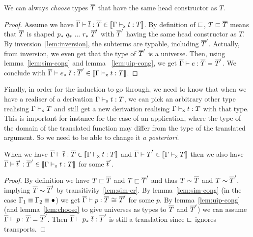\begin{lemma}
  \label{lem:choose}
  We can always \emph{choose} types $\overline{T}$ that have the same head constructor
  as $T$.
\end{lemma}

\begin{proof}
  Assume we have $\overline{\Gamma} \vdash \overline{t} : \overline{T} \in \llbracket \Gamma \vdash_{\mathsf{x}} t : T \rrbracket$.
  By definition of $\sqsubset$,
  $T \sqsubset \overline{T}$ means that $\overline{T}$ is shaped
  $\translpo{p}\ \translpo{q}\ ...\ \translpo{r}\ \Tb'$ with $\overline{T}'$ having
  the same head constructor as $T$. By inversion~\eqref{lem:inversion}, the
  subterms are typable, including $\overline{T}'$. Actually, from inversion, we
  even get that the type of $\overline{T}'$ is a universe. Then,
  using lemma~\ref{lem:sim-cong} and lemma~
  \ref{lem:uip-cong}, we get $\overline{\Gamma} \vdash e : \overline{T} =_{} \overline{T}'$.
  We conclude with
  $\isterm{\Gb}{\translpo{e}\ \tb}{\Tb'} \in \transl{\xisterm{\Ga}{t}{T}}$.
\end{proof}

Finally, in order for the induction to go through, we need to know
that when we have a realiser of a derivation $\Gamma \vdash_{\mathsf{x}} t : T$, we can
pick an arbitrary other type realising $\Gamma \vdash_{\mathsf{x}} T$ and still
get a new derivation realising $\Gamma \vdash_{\mathsf{x}} t : T$ with that type.
%
This is important for instance for the case of an application, where
the type of the domain of the translated function may differ from the
type of the translated argument. So we need to be able to change it \textit{a
posteriori}.


\begin{lemma}
  \label{lem:change-type}
  When we have $\overline{\Gamma} \vdash \overline{t} : \overline{T} \in \llbracket \Gamma \vdash_{\mathsf{x}} t : T \rrbracket$
  and $\overline{\Gamma} \vdash \overline{T}' \in \llbracket \Gamma \vdash_{\mathsf{x}} T \rrbracket$ then we also have
  $\overline{\Gamma} \vdash \overline{t}' : \overline{T}' \in \llbracket \Gamma \vdash_{\mathsf{x}} t : T \rrbracket$ for some $\overline{t}'$.
\end{lemma}

\begin{proof}
  By definition we have $T \sqsubset \overline{T}$ and $T \sqsubset \overline{T}'$ and thus $T \sim \overline{T}$ and
  $T \sim \overline{T}'$, implying $\overline{T} \sim \overline{T}'$ by transitivity~\eqref{lem:sim-er}.
  By lemma~\ref{lem:sim-cong}
  (in the case $\Gamma_1 \equiv \Gamma_2 \equiv \bullet$) we get
  $\overline{\Gamma} \vdash p : \overline{T} \mathrel{{}_{}{\cong}_{}} \overline{T}'$ for some $p$.
  By lemma~\ref{lem:uip-cong} (and lemma~\ref{lem:choose} to give
  universes as types to $\overline{T}$ and $\overline{T}'$) we can assume
  $\overline{\Gamma} \vdash p : \overline{T} =_{} \overline{T}'$. Then
  $\overline{\Gamma} \vdash p_*\ \overline{t} : \overline{T}'$ is still a translation since $\sqsubset$
  ignores transports.
\end{proof}

